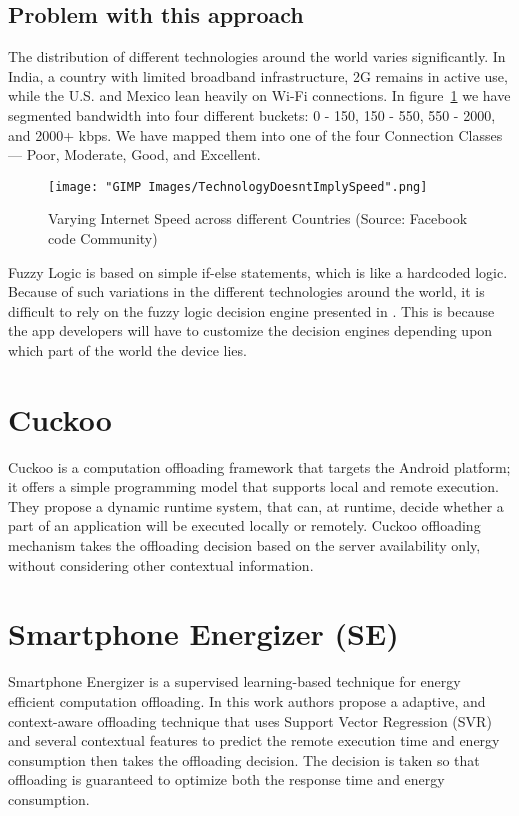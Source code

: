 \documentclass[12pt]{report}
\begin{document}
\subsection{Problem with this approach}
The distribution of different technologies around the world varies significantly. In India, a country with limited broadband infrastructure, 2G remains in active use, while the U.S. and Mexico lean heavily on Wi-Fi connections.
In figure~\ref{fig:TechnologyDoesntImplySpeed} we have segmented bandwidth into four different buckets: 0 - 150, 150 - 550, 550 - 2000, and 2000+ kbps. We have mapped them into one of the four Connection Classes — Poor, Moderate, Good, and Excellent.
\begin{figure}[h]
  \centering
  \texttt{[image: "GIMP Images/TechnologyDoesntImplySpeed".png]}
  \caption{Varying Internet Speed across different Countries (Source: Facebook code Community)}
  \label{fig:TechnologyDoesntImplySpeed}
\end{figure}

Fuzzy Logic is based on simple if-else statements, which is like a hardcoded logic.
Because of such variations in the different technologies around the world, it is difficult to rely on the fuzzy logic decision engine presented in \cite{flores2013adaptive}. This is because the app developers will have to customize the decision engines depending upon which part of the world the device lies. 
\section{Cuckoo}
Cuckoo \cite{kemp2012cuckoo} is a computation offloading framework that targets the Android platform; it offers a simple
programming model that supports local and remote execution. They propose a dynamic runtime system, that can, at runtime, decide whether a part of an application will be executed locally or remotely. Cuckoo offloading mechanism takes the offloading decision based on the server availability only, without considering other contextual information. 

\section{Smartphone Energizer (SE) }
Smartphone Energizer \cite{khairy2013smartphone} is a supervised learning-based technique for energy efficient computation offloading. In this work authors propose a adaptive, and context-aware offloading technique that uses Support Vector
Regression (SVR) and several contextual features to predict the remote execution time and energy consumption then takes the offloading decision. The decision is taken so that offloading is guaranteed to optimize both the response time and energy
consumption.
\end{document}
